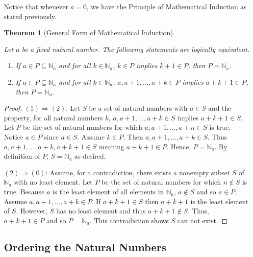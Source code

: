 \documentclass[
  twoside,
  12pt,
  letterpaper]{article}
\providecommand{\tightlist}{%
  \setlength{\itemsep}{0pt}\setlength{\parskip}{0pt}}\usepackage{longtable,booktabs,array}
\theoremstyle{definition}
\theoremstyle{plain}
\theoremstyle{plain}
\newtheorem{theorem}{Theorem}[section]
\theoremstyle{definition}
\theoremstyle{definition}
\theoremstyle{remark}
\begin{document}
Notice that whenever \(a=0\), we have the Principle of Mathematical
Induction as stated previously.

\begin{theorem}[General Form of Mathematical
Induction]\protect\hypertarget{thm-mathematical-induction-equivalence}{}\label{thm-mathematical-induction-equivalence}

Let \(a\) be a fixed natural number. The following statements are
logically equivalent.

\begin{enumerate}
\def\labelenumi{\arabic{enumi}.}
\tightlist
\item
  If \(a\in P\subseteq\mathbb{N}_a\) and for all \(k\in \mathbb{N}_a\),
  \(k \in P\) implies \(k+1 \in P\), then \(P=\mathbb{N}_a\).
\item
  If \(a\in P\subseteq\mathbb{N}_a\) and for all \(k\in \mathbb{N}_a\),
  \(a,a+1,\ldots,a+k \in P\) implies \(a+k+1 \in P\), then
  \(P=\mathbb{N}_a\).
\end{enumerate}

\end{theorem}

\begin{proof}

\((1)\Rightarrow (2)\): Let \(S\) be a set of natural numbers with
\(a\in S\) and the property, for all natural numbers \(k\),
\(a,a+1,\ldots,a+k\in S\) implies \(a+k+1\in S\). Let \(P\) be the set
of natural numbers for which \(a,a+1, \ldots, a+n\in S\) is true. Notice
\(a\in P\) since \(a\in S\). Assume \(k\in P\). Then
\(a,a+1, \ldots, a+k\in S\). Thus \(a,a+1,\ldots, a+k, a+k+1\in S\)
meaning \(a+k+1\in P\). Hence, \(P=\mathbb{N}_a\). By definition of
\(P\), \(S=\mathbb{N}_a\) as desired.

\((2)\Rightarrow (0)\): Assume, for a contradiction, there exists a
nonempty subset \(S\) of \(\mathbb{N}_a\) with no least element. Let
\(P\) be the set of natural numbers for which \(n\notin S\) is true.
Because \(a\) is the least element of all elements in \(\mathbb{N}_a\),
\(a\notin S\) and so \(a\in P\). Assume \(a,a+1,\ldots,a+k\in P\). If
\(a+k+1\in S\) then \(a+k+1\) is the least element of \(S\). However,
\(S\) has no least element and thus \(a+k+1\notin S\). Thus,
\(a+k+1\in P\) and so \(P=\mathbb{N}_a\). This contradiction shows \(S\)
can not exist.

\end{proof}

\hypertarget{ordering-the-natural-numbers}{%
\subsection{Ordering the Natural
Numbers}\label{ordering-the-natural-numbers}}
\end{document}
